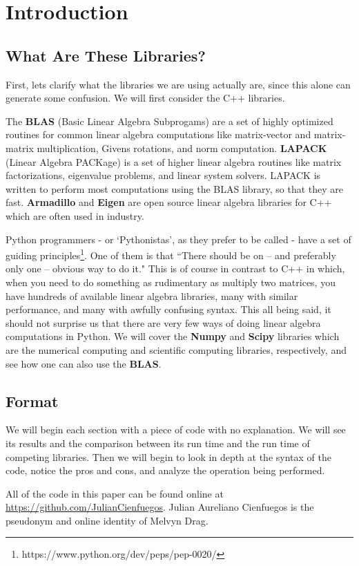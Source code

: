 \chapter{Introduction}
\section{What Are These Libraries?}
First, lets clarify what the libraries we are using actually are, since this alone can generate some confusion. We will first consider the C++ libraries.

The \textbf{BLAS} (Basic Linear Algebra Subprogams) are a set of highly optimized routines for common linear algebra computations like matrix-vector and matrix-matrix multiplication, Givens rotations, and norm computation. \textbf{LAPACK} (Linear Algebra PACKage) is a set of higher linear algebra routines like matrix factorizations, eigenvalue problems, and linear system solvers. LAPACK is written to perform most computations using the BLAS library, so that they are fast. \textbf{Armadillo} and \textbf{Eigen} are open source linear algebra libraries for C++ which are often used in industry.

Python programmers - or `Pythonistas', as they prefer to be called - have a set of guiding principles\footnote{https://www.python.org/dev/peps/pep-0020/}. One of them is that ``There should be on -- and preferably only one -- obvious way to do it." This is of course in contrast to C++ in which, when you need to do something as rudimentary as multiply two matrices, you have hundreds of available linear algebra libraries, many with similar performance, and many with awfully confusing syntax. This all being said, it should not surprise us that there are very few ways of doing linear algebra computations in Python. We will cover the \textbf{Numpy} and \textbf{Scipy} libraries which are the numerical computing and scientific computing libraries, respectively, and see how one can also use the \textbf{BLAS}.

\section{Format}
We will begin each section with a piece of code with no explanation. We will see its results and the comparison between its run time and the run time of competing libraries. Then we will begin to look in depth at the syntax of the code, notice the pros and cons, and analyze the operation being performed.

All of the code in this paper can be found online at \url{https://github.com/JulianCienfuegos}. Julian Aureliano Cienfuegos is the pseudonym and online identity of Melvyn Drag.